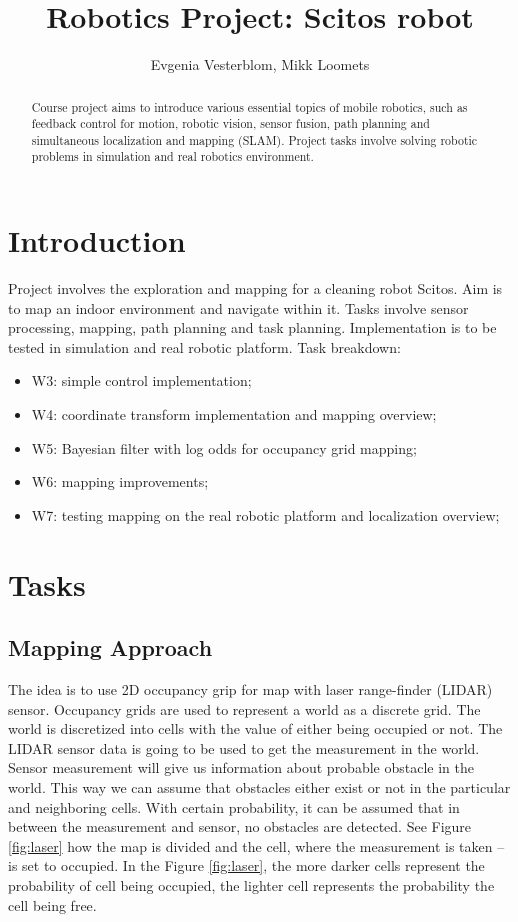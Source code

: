 \documentclass{article}
\title{Robotics Project: Scitos robot}
\author{Evgenia Vesterblom, Mikk Loomets}
\begin{document}
\maketitle

\begin{abstract}
Course project aims to introduce various essential topics of mobile robotics, such as feedback control for motion, robotic vision, sensor fusion, path planning and simultaneous localization and mapping (SLAM). Project tasks involve solving robotic problems in simulation and real robotics environment. 
\end{abstract}

\section{Introduction}
Project involves the exploration and mapping for a cleaning robot Scitos. Aim is to map an indoor environment and navigate within it. Tasks involve sensor processing, mapping, path planning and task planning. Implementation is to be tested in simulation and real robotic platform.
Task breakdown:
\begin{itemize}
\item W3: simple control implementation;
\item W4: coordinate transform implementation and mapping overview;
\item W5: Bayesian filter with log odds for occupancy grid mapping;
\item W6: mapping improvements;
\item W7: testing mapping on the real robotic platform and localization overview;
\end{itemize}

\section{Tasks}

\subsection{Mapping Approach}

The idea is to use 2D occupancy grip for map with laser range-finder (LIDAR) sensor. Occupancy grids are used to represent a world as a discrete grid. The world is discretized into cells with the value of either being occupied or not. The LIDAR sensor data is going to be used to get the measurement in the world. Sensor measurement will give us information about probable obstacle in the world. This way we can assume that obstacles either exist or not in the particular and neighboring cells. With certain probability, it can be assumed that in between the measurement and sensor, no obstacles are detected. See Figure \ref{fig:laser} how the map is divided and the cell, where the measurement is taken -- is set to occupied. In the Figure \ref{fig:laser}, the more darker cells represent the probability of cell being occupied, the lighter cell represents the probability the cell being free.
\end{document}
